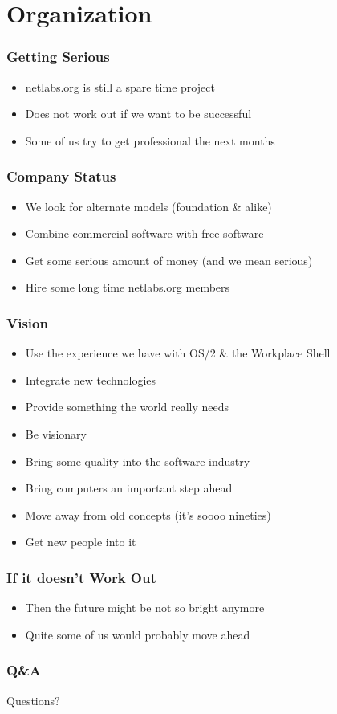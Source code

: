 \documentclass{beamer}
\begin{document}
\section{Organization}

\begin{frame}
\frametitle{Getting Serious}
\begin{itemize}
  \item netlabs.org is still a spare time project
  \item Does not work out if we want to be successful
  \item Some of us try to get professional the next months
\end{itemize}
\end{frame}

\begin{frame}
\frametitle{Company Status}
\begin{itemize}
  \item We look for alternate models (foundation \& alike)
  \item Combine commercial software with free software
  \item Get some serious amount of money (and we mean serious)
  \item Hire some long time netlabs.org members
\end{itemize}
\end{frame}

\begin{frame}[allowframebreaks=0.6]
\frametitle{Vision}
\begin{itemize}
  \item Use the experience we have with OS/2 \& the Workplace Shell
  \item Integrate new technologies
  \item Provide something the world really needs
  \item Be visionary
  \item Bring some quality into the software industry
  \item Bring computers an important step ahead
  \item Move away from old concepts (it's soooo nineties)
  \item Get new people into it
\end{itemize}
\end{frame}

\begin{frame}
\frametitle{If it doesn't Work Out
}
\begin{itemize}
  \item Then the future might be not so bright anymore
  \item Quite some of us would probably move ahead
\end{itemize}
\end{frame}

\begin{frame}
\frametitle{Q\&A}
	Questions?
\end{frame}
\end{document}
